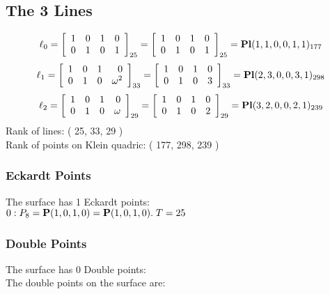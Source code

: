 \documentclass{article}
\newcommand{\bP}{{\bf P}}
\begin{document}
{\subsection*{The 3 Lines}
$$
\ell_{0} = 
\left[
\begin{array}{*{4}{r}}
1 & 0 & 1 & 0\\
0 & 1 & 0 & 1\\
\end{array}
\right]
_{25}
=
\left[
\begin{array}{*{4}c}
1  & 0  & 1  & 0\\
0  & 1  & 0  & 1\\
\end{array}
\right]_{25}
={\rm\bf Pl}(1,1,0,0,1,1 )_{177}$$
$$
\ell_{1} = 
\left[
\begin{array}{*{4}{r}}
1 & 0 & 1 & 0\\
0 & 1 & 0 & \omega^{2}\\
\end{array}
\right]
_{33}
=
\left[
\begin{array}{*{4}c}
1  & 0  & 1  & 0\\
0  & 1  & 0  & 3\\
\end{array}
\right]_{33}
={\rm\bf Pl}(2,3,0,0,3,1 )_{298}$$
$$
\ell_{2} = 
\left[
\begin{array}{*{4}{r}}
1 & 0 & 1 & 0\\
0 & 1 & 0 & \omega \\
\end{array}
\right]
_{29}
=
\left[
\begin{array}{*{4}c}
1  & 0  & 1  & 0\\
0  & 1  & 0  & 2\\
\end{array}
\right]_{29}
={\rm\bf Pl}(3,2,0,0,2,1 )_{239}$$
Rank of lines: ( 25, 33, 29 )\\
Rank of points on Klein quadric: ( 177, 298, 239 )\\
\subsubsection*{Eckardt Points}
The surface has 1 Eckardt points:\\
$0 : P_{8}=\bP(1, 0, 1, 0) = \bP(1, 0, 1, 0).\; T= 25$\\
\subsubsection*{Double Points}
The surface has 0 Double points:\\
The double points on the surface are:\\
\begin{multicols}{2}
\noindent
\end{multicols}
}
\end{document}
